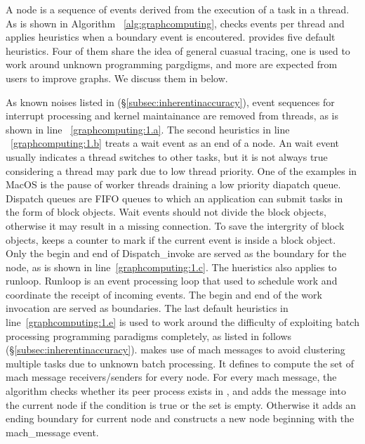 A node is a sequence of events derived from the execution of a task in a thread.
As is shown in Algorithm ~\ref{alg:graphcomputing}, \xxx checks events per
thread and applies heuristics when a boundary event is encoutered. \xxx provides
five default heuristics. Four of them share the idea of general cuasual tracing,
one is used to work around unknown programming pargdigms, and more are expected
from users to improve graphs. We discuss them in below.

As known noises listed in (\S\ref{subsec:inherentinaccuracy}), event sequences
for interrupt processing and kernel maintainance are removed from threads,
as is shown in line ~\ref{graphcomputing:1.a}. The second heuristics in line
~\ref{graphcomputing:1.b} treats a wait event as an end of a node. An wait event
usually indicates a thread switches to other tasks, but it is not always true
considering a thread may park due to low thread priority. One of the examples
in MacOS is the pause of worker threads draining a low priority diapatch queue.
Dispatch queues are FIFO queues to which an application can submit tasks in
the form of block objects. Wait events should not divide the block objects,
otherwise it may result in a missing connection. To save the intergrity of block
objects, \xxx keeps a counter  to mark if the current event
is inside a block object. Only the begin and end of Dispatch\_invoke are served
as the boundary for the node, as is shown in line~\ref{graphcomputing:1.c}.
The hueristics also applies to runloop. Runloop is an event processing loop
that used to schedule work and coordinate the receipt of incoming events.
The begin and end of the work invocation are served as boundaries. The last
default heuristics in line~\ref{graphcomputing:1.e} is used to work around the
difficulty of exploiting batch processing programming paradigms completely, as
listed in follows (\S\ref{subsec:inherentinaccuracy}). \xxx makes use of mach
messages to avoid clustering multiple tasks due to unknown batch processing. It
defines  to compute the set of mach message receivers/senders
for every node. For every mach message, the algorithm checks whether its
peer process exists in , and adds the message into the
current node if the condition is true or the set is empty. Otherwise it adds an
ending boundary for current node and constructs a new node beginning with the
mach\_message event.

